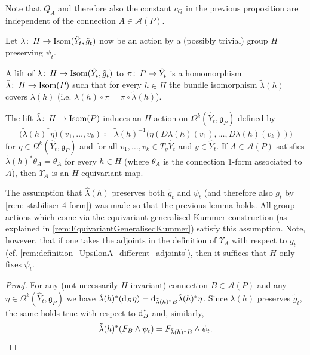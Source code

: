 \documentclass[11pt,a4paper]{scrartcl}
\newcommand*\diff{\mathop{}\!\textup{d}}
\newcommand{\col}{\colon \thinspace}
\numberwithin{equation}{section}
\theoremstyle{plain}
\theoremstyle{definition}
\theoremstyle{remark}
\begin{document}
\begin{remark}
Note that $Q_A$ and therefore also the constant $c_Q$ in the previous proposition are independent of the connection $A\in \mathcal{A}(P)$.
\end{remark}

Let $\lambda\col H \to \textup{Isom}(\hat{Y}_t,\tilde{g}_{t})$ now be an action by a (possibly trivial) group $H$ preserving $\psi_t$.
\begin{definition}
A lift of $\lambda \col H \to \textup{Isom}(\hat{Y}_t,\tilde{g}_{t})$ to $\pi \col P \to \hat{Y}_t$ is a homomorphism $\tilde{\lambda}\col H \to \textup{Isom}(P)$ such that for every $h\in H$ the bundle isomorphism $\tilde{\lambda}(h)$ covers $\lambda(h)$ (i.e. $\lambda(h) \circ \pi = \pi \circ \tilde{\lambda}(h)$).
\end{definition}
\begin{lemma}
The lift $\tilde{\lambda} \col H \to \textup{Isom}(P)$ induces an $H$-action on $\Omega^k(\hat{Y}_t,\mathfrak{g}_P)$ defined by \[ \big(\tilde{\lambda}(h)^*\eta \big) (v_1,\dots,v_k) \coloneqq \tilde{\lambda}(h)^{-1}\big(\eta(D\lambda(h)(v_1),\dots,D\lambda(h)(v_k))\big) \] for $\eta \in \Omega^k(\hat{Y}_t,\mathfrak{g}_P)$ and for all $v_1,\dots,v_k \in T_y\hat{Y}_t$ and $y \in \hat{Y}_t$. If $A \in \mathcal{A}(P)$ satisfies $\tilde{\lambda}(h)^*\theta_A = \theta_A$ for every $h\in H$ (where $\theta_A$ is the connection 1-form associated to $A$), then $\Upsilon_A$ is an $H$-equivariant map.
\end{lemma}
\begin{remark}
The assumption that $\hat{\lambda}(h)$ preserves both $\tilde{g}_t$ and $\psi_t$ (and therefore also $g_t$ by \autoref{rem: stabiliser 4-form}) was made so that the previous lemma holds. All group actions which come via the equivariant generalised Kummer construction (as explained in \autoref{rem:EquivariantGeneralisedKummer}) satisfy this assumption. Note, however, that if one takes the adjoints in the definition of $\Upsilon_A$ with respect to $g_t$ (cf. \autoref{rem:definition_UpsilonA_different_adjoints}), then it suffices that $H$ only fixes $\psi_t$.
\end{remark}
\begin{proof}
For any (not necessarily $H$-invariant) connection $B\in \mathcal{A}(P)$ and any $\eta \in \Omega^k(\hat{Y}_t,\mathfrak{g}_P)$ we have $\tilde{\lambda}(h)^* (\diff_B \eta) = \diff_{\tilde{\lambda}(h)^*B} \tilde{\lambda}(h)^*\eta$. Since $\lambda(h)$ preserves $\tilde{g}_t$, the same holds true with respect to $\diff_B^*$ and, similarly, \[ \tilde{\lambda}(h)^*(F_{B} \wedge \psi_t) = F_{\tilde{\lambda}(h)^*B} \wedge \psi_t. \qedhere \]
\end{proof}
\end{document}
